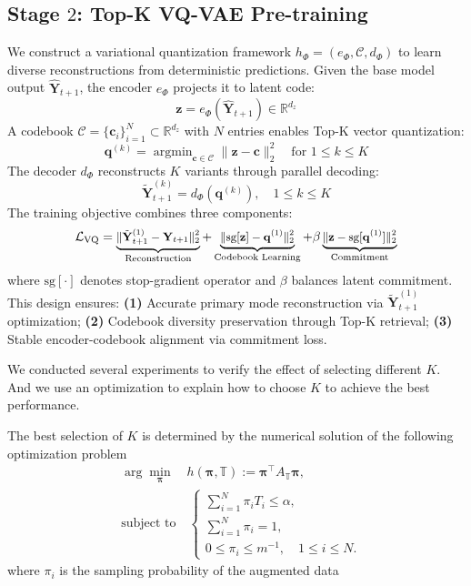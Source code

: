 \subsection{Stage $2$: Top-K VQ-VAE Pre-training}  
We construct a variational quantization framework $h_\Phi = (e_\Phi, \mathcal{C}, d_\Phi)$ to learn diverse reconstructions from deterministic predictions. Given the base model output $\hat{\mathbf{Y}}_{t+1}$, the encoder $e_\Phi$ projects it to latent code:
\begin{equation}
\mathbf{z} = e_\Phi(\hat{\mathbf{Y}}_{t+1}) \in \mathbb{R}^{d_z}
\end{equation}
A codebook $\mathcal{C} = \{\mathbf{c}_i\}_{i=1}^N \subset \mathbb{R}^{d_z}$ with $N$ entries enables Top-K vector quantization:
\begin{equation}
\mathbf{q}^{(k)} = \mathop{\text{argmin}}_{\mathbf{c} \in \mathcal{C}} \|\mathbf{z} - \mathbf{c}\|_2^2 \quad \text{for } 1 \leq k \leq K
\end{equation}
The decoder $d_\Phi$ reconstructs $K$ variants through parallel decoding:
\begin{equation}
\tilde{\mathbf{Y}}_{t+1}^{(k)} = d_\Phi(\mathbf{q}^{(k)}), \quad 1 \leq k \leq K
\end{equation}
The training objective combines three components:
\begin{equation}\small
\mathcal{L}_{\text{VQ}} = \underbrace{\|\tilde{\mathbf{Y}}_{t+1}^{(1)} - \mathbf{Y}_{t+1}\|_2^2}_{\text{Reconstruction}} + \underbrace{\|\text{sg}[\mathbf{z}] - \mathbf{q}^{(1)}\|_2^2}_{\text{Codebook Learning}} + \beta\underbrace{\|\mathbf{z} - \text{sg}[\mathbf{q}^{(1)}]\|_2^2}_{\text{Commitment}}
\end{equation}
where $\text{sg}[\cdot]$ denotes stop-gradient operator and $\beta$ balances latent commitment. This design ensures:  
\textbf{(1)} Accurate primary mode reconstruction via $\tilde{\mathbf{Y}}_{t+1}^{(1)}$ optimization;  
\textbf{(2)} Codebook diversity preservation through Top-K retrieval;  
\textbf{(3)} Stable encoder-codebook alignment via commitment loss.

We conducted several experiments to verify the effect of selecting different $K$. And we use an optimization to explain how to choose $K$ to achieve the best performance.

\begin{theorem}
    The best selection of $K$ is determined by the numerical solution of the following optimization problem
    \begin{align}
    & \arg\min_{\boldsymbol{\pi}}\quad h(\boldsymbol{\pi},\mathbb{T}):=\boldsymbol{\pi}^\top A_\mathbb{T}\boldsymbol{\pi}, \\
    & \text{subject to} \quad
        \begin{cases}
            \sum_{i = 1}^N\pi_iT_i\leq\alpha, \\
            \sum_{i = 1}^N\pi_i = 1, \\
            0\leq\pi_i\leq m^{-1}, \quad 1\leq i\leq N.
        \end{cases}
    \end{align}
    where $\pi_i$ is the sampling probability of the augmented data
\end{theorem}


